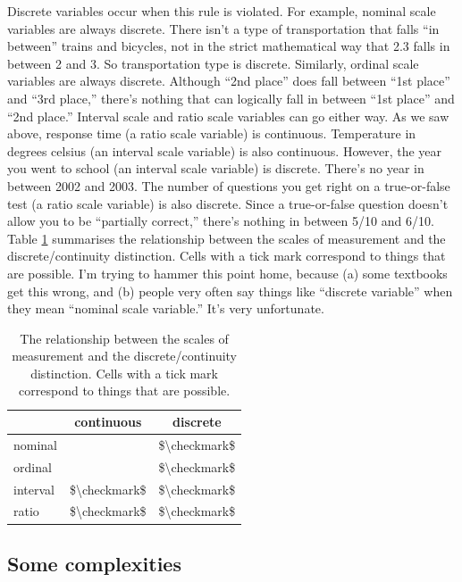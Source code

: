 \documentclass[
]{book}
\begin{document}
Discrete variables occur when this rule is violated. For example, nominal scale variables are always discrete. There isn't a type of transportation that falls ``in between'' trains and bicycles, not in the strict mathematical way that 2.3 falls in between 2 and 3. So transportation type is discrete. Similarly, ordinal scale variables are always discrete. Although ``2nd place'' does fall between ``1st place'' and ``3rd place,'' there's nothing that can logically fall in between ``1st place'' and ``2nd place.'' Interval scale and ratio scale variables can go either way. As we saw above, response time (a ratio scale variable) is continuous. Temperature in degrees celsius (an interval scale variable) is also continuous. However, the year you went to school (an interval scale variable) is discrete. There's no year in between 2002 and 2003. The number of questions you get right on a true-or-false test (a ratio scale variable) is also discrete. Since a true-or-false question doesn't allow you to be ``partially correct,'' there's nothing in between 5/10 and 6/10. Table \ref{tab:scalescont} summarises the relationship between the scales of measurement and the discrete/continuity distinction. Cells with a tick mark correspond to things that are possible. I'm trying to hammer this point home, because (a) some textbooks get this wrong, and (b) people very often say things like ``discrete variable'' when they mean ``nominal scale variable.'' It's very unfortunate.

\begin{table}

\caption{\label{tab:scalescont}The relationship between the scales of measurement and the discrete/continuity distinction. Cells with a tick mark correspond to things that are possible.}
\centering
\begin{tabular}[t]{lcc}
\toprule
 & continuous & discrete\\
\midrule
nominal &  & \$\textbackslash{}checkmark\$\\
ordinal &  & \$\textbackslash{}checkmark\$\\
interval & \$\textbackslash{}checkmark\$ & \$\textbackslash{}checkmark\$\\
ratio & \$\textbackslash{}checkmark\$ & \$\textbackslash{}checkmark\$\\
\bottomrule
\end{tabular}
\end{table}

\hypertarget{some-complexities}{%
\subsection{Some complexities}\label{some-complexities}}
\end{document}
